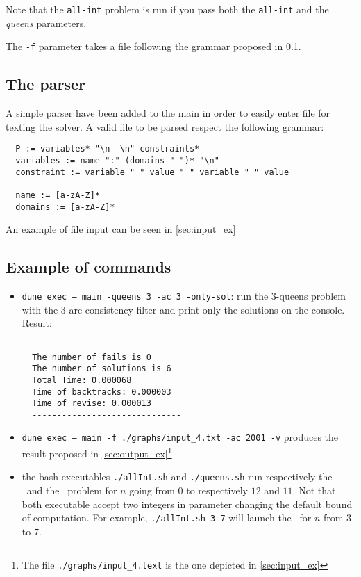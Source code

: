 \documentclass{rapport}
\begin{document}
Note that the \texttt{all-int} problem is run if you pass both the \texttt{all-int} and the \textit{queens} parameters.

The \texttt{-f} parameter takes a file following the grammar proposed in \cref{sec:parser}.

\subsection{The parser}
\label{sec:parser}

A simple parser have been added to the main in order to easily enter file for texting the solver. A valid file to be parsed respect the following grammar:

\begin{verbatim}
  P := variables* "\n--\n" constraints*
  variables := name ":" (domains " ")* "\n"  
  constraint := variable " " value " " variable " " value

  name := [a-zA-Z]*
  domains := [a-zA-Z]*
\end{verbatim}

An example of file input can be seen in \cref{sec:input_ex}


\subsection{Example of commands}

\begin{itemize}
  \item \texttt{dune exec -- main -queens 3 -ac 3 -only-sol}: run the 3-queens problem with the \ac{3} arc consistency filter and print only the solutions on the console. Result:\\
        \begin{verbatim}
  ------------------------------
  The number of fails is 0
  The number of solutions is 6
  Total Time: 0.000068
  Time of backtracks: 0.000003
  Time of revise: 0.000013
  ------------------------------
  \end{verbatim}
  \item \texttt{dune exec -- main -f ./graphs/input\_4.txt -ac 2001 -v} produces the result proposed in \cref{sec:output_ex}\footnote{The file \texttt{./graphs/input\_4.text} is the one depicted in \cref{sec:input_ex}}
  \item the bash executables \texttt{./allInt.sh} and \texttt{./queens.sh} run respectively the \allint\ and the \queens\ problem for $n$ going from $0$ to respectively $12$ and $11$. Not that both executable accept two integers in parameter changing the default bound of computation. For example, \texttt{./allInt.sh 3 7} will launch the \allint\ for $n$ from $3$ to $7$.

\end{itemize}
\end{document}
